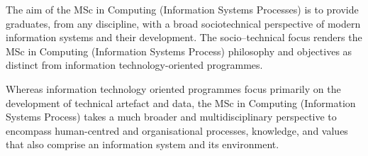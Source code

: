 \documentclass[openany,twoside]{report}
\begin{document}

\begin{programmeAim}{The aim of the MSc in Computing (Information Systems Processes) is}   to provide graduates, from any discipline, with a broad sociotechnical perspective of modern information systems and their development. The socio--technical focus renders the MSc in Computing (Information Systems Process) philosophy and objectives as distinct from information technology-oriented programmes. 
	
	Whereas information technology oriented programmes focus primarily on the development of technical artefact and data, the MSc in Computing (Information Systems Process) takes a much broader and multidisciplinary perspective to encompass human-centred and organisational processes, knowledge, and values that also comprise an information system and its environment.

\end{programmeAim}

\vfill\mbox{}\clearpage

\vfill


\end{document}

